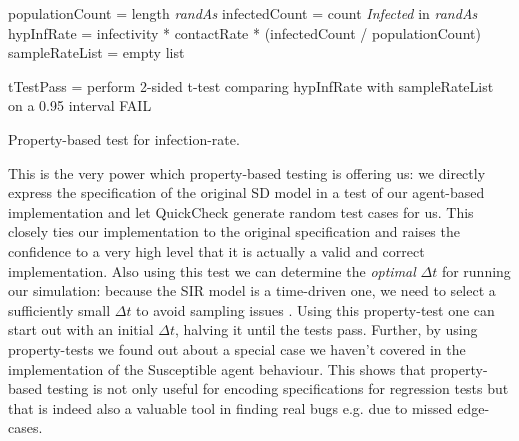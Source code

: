 \begin{algorithm}
populationCount = length \textit{randAs}\;
infectedCount   = count \textit{Infected} in \textit{randAs}\;
hypInfRate      = infectivity * contactRate * (infectedCount / populationCount)\;
sampleRateList  = empty list\;


tTestPass = perform 2-sided t-test comparing hypInfRate with sampleRateList on a 0.95 interval\;
 {
  FAIL\;
}
\caption{Property-based test for infection-rate.}
\label{alg:prop_test_infectionrate}
\end{algorithm}

This is the very power which property-based testing is offering us: we directly express the specification of the original SD model in a test of our agent-based implementation and let QuickCheck generate random test cases for us. This closely ties our implementation to the original specification and raises the confidence to a very high level that it is actually a valid and correct implementation. Also using this test we can determine the \textit{optimal} $\Delta t$ for running our simulation: because the SIR model is a time-driven one, we need to select a sufficiently small $\Delta t$ to avoid sampling issues \cite{thaler_pure_2018}. Using this property-test one can start out with an initial $\Delta t$, halving it until the tests pass.
Further, by using property-tests we found out about a special case we haven't covered in the implementation of the Susceptible agent behaviour. This shows that property-based testing is not only useful for encoding specifications for regression tests but that is indeed also a valuable tool in finding real bugs e.g. due to missed edge-cases. 